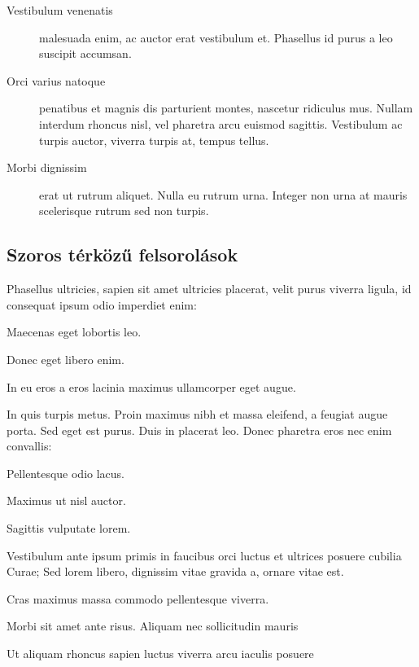 \begin{description}
	\item[Vestibulum venenatis] malesuada enim, ac auctor erat vestibulum et. Phasellus id purus a leo suscipit accumsan.
	\item[Orci varius natoque] penatibus et magnis dis parturient montes, nascetur ridiculus mus. Nullam interdum rhoncus nisl, vel pharetra arcu euismod sagittis. Vestibulum ac turpis auctor, viverra turpis at, tempus tellus.
	\item[Morbi dignissim] erat ut rutrum aliquet. Nulla eu rutrum urna. Integer non urna at mauris scelerisque rutrum sed non turpis.
\end{description}

\subsection{Szoros térközű felsorolások} %

Phasellus ultricies, sapien sit amet ultricies placerat, velit purus viverra ligula, id consequat ipsum odio imperdiet enim:
\begin{compactenum}
	\item Maecenas eget lobortis leo.
	\item Donec eget libero enim.
	\item In eu eros a eros lacinia maximus ullamcorper eget augue.
\end{compactenum}

\bigskip

In quis turpis metus. Proin maximus nibh et massa eleifend, a feugiat augue porta. Sed eget est purus. Duis in placerat leo. Donec pharetra eros nec enim convallis:
\begin{compactitem}
	\item Pellentesque odio lacus.
	\item Maximus ut nisl auctor.
	\item Sagittis vulputate lorem.
\end{compactitem}

\bigskip

Vestibulum ante ipsum primis in faucibus orci luctus et ultrices posuere cubilia Curae; Sed lorem libero, dignissim vitae gravida a, ornare vitae est.
\begin{compactdesc}
	\item[Cras maximus] massa commodo pellentesque viverra.
	\item[Morbi sit] amet ante risus. Aliquam nec sollicitudin mauris
	\item[Ut aliquam rhoncus sapien] luctus viverra arcu iaculis posuere
\end{compactdesc}


